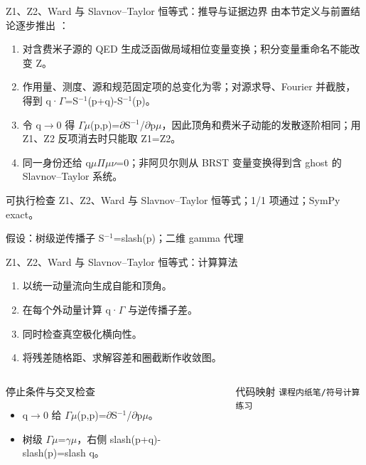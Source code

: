 \begin{frame}[t]{Z1、Z2、Ward 与 Slavnov--Taylor 恒等式：推导与证据边界}
\footnotesize
{}\quad 由本节定义与前置结论逐步推出 ：
\begin{enumerate}
\item 对含费米子源的 QED 生成泛函做局域相位变量变换；积分变量重命名不能改变 Z。
\item 作用量、测度、源和规范固定项的总变化为零；对源求导、Fourier 并截肢，得到 q·\ensuremath{\Gamma}=S\ensuremath{^{-1}}(p+q)-S\ensuremath{^{-1}}(p)。
\item 令 q\ensuremath{\rightarrow}0 得 \ensuremath{\Gamma}\ensuremath{\mu}(p,p)=\ensuremath{\partial}S\ensuremath{^{-1}}/\allowbreak{}\ensuremath{\partial}p\ensuremath{\mu}，因此顶角和费米子动能的发散逐阶相同；用 Z1、Z2 反项消去时只能取 Z1=Z2。
\item 同一身份还给 q\ensuremath{\mu}\ensuremath{\Pi}\ensuremath{\mu}\ensuremath{\nu}=0；非阿贝尔则从 BRST 变量变换得到含 ghost 的 Slavnov--Taylor 系统。
\end{enumerate}\begin{block}{可执行检查}
\quad Z1、Z2、Ward 与 Slavnov--Taylor 恒等式；1/1 项通过；SymPy exact。
\par\scriptsize 假设：树级逆传播子 S\ensuremath{^{-1}}=slash(p)；二维 gamma 代理
\end{block}
\end{frame}

\begin{frame}[t]{Z1、Z2、Ward 与 Slavnov--Taylor 恒等式：计算算法}
\footnotesize
{}\begin{enumerate}
\item 以统一动量流向生成自能和顶角。
\item 在每个外动量计算 q·\ensuremath{\Gamma} 与逆传播子差。
\item 同时检查真空极化横向性。
\item 将残差随格距、求解容差和圈截断作收敛图。
\end{enumerate}\begin{columns}[T,onlytextwidth]
\begin{block}{停止条件与交叉检查}\scriptsize\begin{itemize}
\item[\CheckMark] q\ensuremath{\rightarrow}0 给 \ensuremath{\Gamma}\ensuremath{\mu}(p,p)=\ensuremath{\partial}S\ensuremath{^{-1}}/\allowbreak{}\ensuremath{\partial}p\ensuremath{\mu}。
\item[\CheckMark] 树级 \ensuremath{\Gamma}\ensuremath{\mu}=\ensuremath{\gamma}\ensuremath{\mu}，右侧 slash(p+q)-slash(p)=slash q。
\end{itemize}\end{block}
\begin{block}{代码映射}
\scriptsize \texttt{课程内纸笔/\allowbreak{}符号计算练习}
\end{block}\end{columns}\end{frame}

